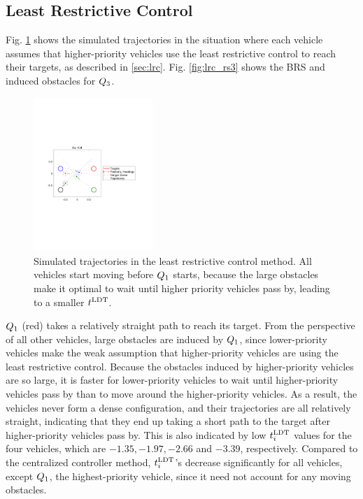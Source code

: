 \subsection{Least Restrictive Control}
Fig. \ref{fig:lrc_traj} shows the simulated trajectories in the situation where each vehicle assumes that higher-priority vehicles use the least restrictive control to reach their targets, as described in \ref{sec:lrc}. Fig. \ref{fig:lrc_rs3} shows the BRS and induced obstacles for $Q_3$.

\begin{figure}
  \centering
  \includegraphics[width=0.40\textwidth]{"fig/lrc_traj"}
  \caption{Simulated trajectories in the least restrictive control method. All vehicles start moving before $Q_1$ starts, because the large obstacles make it optimal to wait until higher priority vehicles pass by, leading to a smaller $t^\text{LDT}$. }
  \label{fig:lrc_traj}
  \vspace{-2em}
\end{figure}

$Q_1$ (red) takes a relatively straight path to reach its target. From the perspective of all other vehicles, large obstacles are induced by $Q_1$, since lower-priority vehicles make the weak assumption that higher-priority vehicles are using the least restrictive control. Because the obstacles induced by higher-priority vehicles are so large, it is faster for lower-priority vehicles to wait until higher-priority vehicles pass by than to move around the higher-priority vehicles. As a result, the vehicles never form a dense configuration, and their trajectories are all relatively straight, indicating that they end up taking a short path to the target after higher-priority vehicles pass by. This is also indicated by low $t^\text{LDT}_i$ values for the four vehicles, which are $-1.35, -1.97, -2.66$ and $-3.39$, respectively. Compared to the centralized controller method, $t^\text{LDT}_i$'s decrease significantly for all vehicles, except $Q_1$, the highest-priority vehicle, since it need not account for any moving obstacles. 


